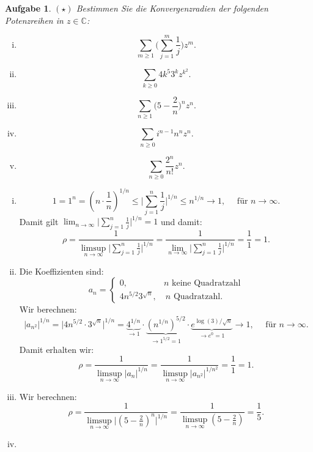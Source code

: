 \documentclass[a4paper, 20]{exam}
\newtheorem{ex}{Aufgabe}
\newcommand\CC{\mathbb{C}}
\begin{document}
\begin{ex}{$(\star)$}
Bestimmen Sie die Konvergenzradien der folgenden Potenzreihen in $z\in \CC$:
\begin{enumerate}[i.)]
\item
$$ \sum_{m\geq 1} \bigg( \sum_{j=1}^m \frac{1}{j} \bigg) z^m.$$
\item
$$ \sum_{k\geq 0} 4k^5 3^k z^{k^2}.$$
\item
$$ \sum_{n\geq 1} \bigg(5- \frac{2}{n} \bigg)^n z^n.$$
\item
$$ \sum_{n\geq 0} i^{n-1}n^n z^n. $$
\item
$$ \sum_{n\geq 0} \frac{2^n}{n!} z^n. $$
\end{enumerate}
\end{ex}
\begin{solution}
\begin{enumerate}[i.)]
\item
$$ 1 = 1^n = \left( n \cdot \frac{1}{n}\right)^{1/n} 
\leq \bigg\vert \sum_{j=1}^{n} \frac{1}{j} \bigg\vert^{1/n}
\leq n^{1/n} \longrightarrow 1, \quad \text{ f\"ur } n \longrightarrow \infty.$$
Damit gilt 
$\lim_{n \rightarrow \infty} \bigg\vert \sum_{j=1}^{n} \frac{1}{j} \bigg\vert^{1/n} =1$ 
und damit:
$$ \rho 
= \frac{1}{\limsup_{n\rightarrow \infty} \bigg\vert \sum_{j=1}^{n} \frac{1}{j} \bigg\vert^{1/n} } 
= \frac{1}{\lim_{n\rightarrow \infty} \bigg\vert \sum_{j=1}^{n} \frac{1}{j} \bigg\vert^{1/n} }
= \frac{1}{1}=1.$$
\item
Die Koeffizienten sind:
$$ a_n = \begin{cases} 0, \qquad \qquad \ n \text{ keine Quadratzahl} \\ 4n^{5/2} 3^{\sqrt{n}}, \quad n \text{ Quadratzahl.}   \end{cases} $$
Wir berechnen:
$$ \vert a_{n^2} \vert^{1/n} =\vert 4n^{5/2}\cdot 3^{\sqrt{n}} \vert^{1/n}
= \underbrace{4^{1/n}}_{\longrightarrow 1} \cdot \underbrace{\left( n^{1/n} \right)^{5/2}}_{\longrightarrow 1^{5/2}=1} \cdot \underbrace{e^{\log(3)/\sqrt{n}}}_{\longrightarrow e^0=1} \longrightarrow 1, \quad \text{ f\"ur } n \longrightarrow \infty.$$
Damit erhalten wir:
$$ \rho = \frac{1}{\limsup_{n \rightarrow \infty} \vert a_n \vert^{1/n}} 
= \frac{1}{\limsup_{n \rightarrow \infty} \vert a_{n^2} \vert^{1/n^2}} 
= \frac{1}{1}= 1.$$
\item
Wir berechnen:
$$ \rho 
= \frac{1}{\limsup_{n \rightarrow \infty} \bigg\vert \left( 5 - \frac{2}{n}\right)^n \bigg\vert^{1/n}}
= \frac{1}{\limsup_{n \rightarrow \infty} \left( 5 - \frac{2}{n}\right)}
= \frac{1}{5}.$$
\item

\end{enumerate}
\end{solution}
\end{document}
